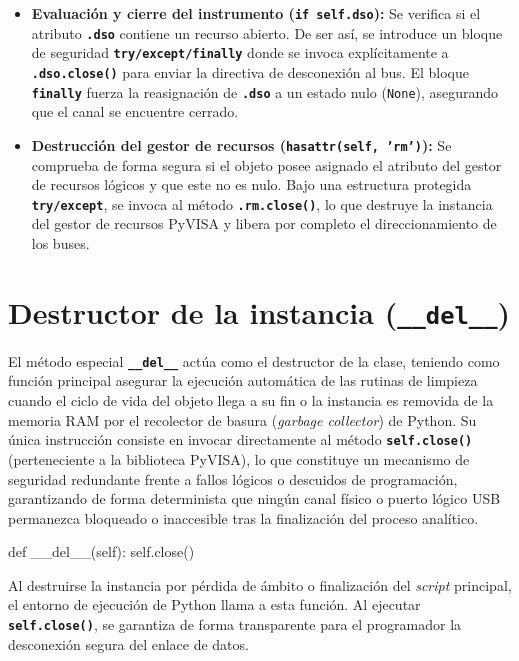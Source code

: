 \begin{itemize}
\item \textbf{Evaluación y cierre del instrumento (\texttt{if self.dso}):} Se verifica si el atributo \textbf{\texttt{.dso}} contiene un recurso abierto. De ser así, se introduce un bloque de seguridad \textbf{\texttt{try/except/finally}} donde se invoca explícitamente a \textbf{\texttt{.dso.close()}} para enviar la directiva de desconexión al bus. El bloque \textbf{\texttt{finally}} fuerza la reasignación de \textbf{\texttt{.dso}} a un estado nulo (\texttt{None}), asegurando que el canal se encuentre cerrado.
\item \textbf{Destrucción del gestor de recursos (\texttt{hasattr(self, 'rm')}):} Se comprueba de forma segura si el objeto posee asignado el atributo del gestor de recursos lógicos y que este no es nulo. Bajo una estructura protegida \textbf{\texttt{try/except}}, se invoca al método \textbf{\texttt{.rm.close()}}, lo que destruye la instancia del gestor de recursos PyVISA y libera por completo el direccionamiento de los buses.
\end{itemize}

\section{Destructor de la instancia (\texttt{\_\_del\_\_})}
El método especial \textbf{\texttt{\_\_del\_\_}} actúa como el destructor de la clase, teniendo como función principal asegurar la ejecución automática de las rutinas de limpieza cuando el ciclo de vida del objeto llega a su fin o la instancia es removida de la memoria RAM por el recolector de basura (\textit{garbage collector}) de Python. Su única instrucción consiste en invocar directamente al método \textbf{\texttt{self.close()}} (perteneciente a la biblioteca PyVISA), lo que constituye un mecanismo de seguridad redundante frente a fallos lógicos o descuidos de programación, garantizando de forma determinista que ningún canal físico o puerto lógico USB permanezca bloqueado o inaccesible tras la finalización del proceso analítico.

\begin{python}
def __del__(self):
    self.close()
\end{python}

Al destruirse la instancia por pérdida de ámbito o finalización del \textit{script} principal, el entorno de ejecución de Python llama a esta función. Al ejecutar \textbf{\texttt{self.close()}}, se garantiza de forma transparente para el programador la desconexión segura del enlace de datos.

